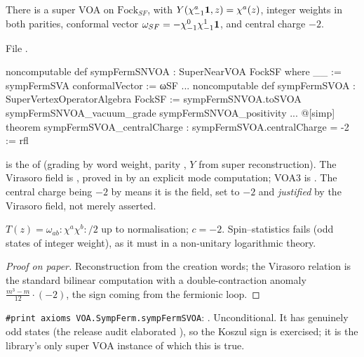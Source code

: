 \begin{theorem}\label{l17:thm:sfsvoa}
There is a super VOA  on $\mathrm{Fock}_{SF}$, with $Y(\chi^a_{-1}\mathbf{1},z)=\chi^a(z)$,
integer weights in both parities, conformal vector $\omega_{SF}=-\chi^0_{-1}\chi^1_{-1}\mathbf{1}$, and
central charge $-2$.
\end{theorem}
\noindent File .
\begin{leancode}
noncomputable def sympFermSNVOA : SuperNearVOA FockSF where
  __ := sympFermSVA
  conformalVector := ωSF
...
noncomputable def sympFermSVOA : SuperVertexOperatorAlgebra FockSF :=
  sympFermSNVOA.toSVOA sympFermSNVOA_vacuum_grade sympFermSNVOA_positivity
...
@[simp] theorem sympFermSVOA_centralCharge : sympFermSVOA.centralCharge = -2 := rfl
\end{leancode}
\begin{dictionary}
 is the  of 
(grading by word weight, parity , $Y$ from super reconstruction). The Virasoro field
is , proved in  by an explicit mode
computation; VOA3 is . The central charge being $-2$ by  means it is the
 field, set to $-2$ and \emph{justified} by the Virasoro field, not merely asserted.
\end{dictionary}
\begin{physics}
$T(z)=\omega_{ab}{:}\chi^a\chi^b{:}/2$ up to normalisation; $c=-2$. Spin--statistics fails (odd
states of integer weight), as it must in a non-unitary logarithmic theory.
\end{physics}
\begin{proof}[Proof on paper]
Reconstruction from the creation words; the Virasoro relation is the standard bilinear computation
with a double-contraction anomaly $\frac{m^3-m}{12}\cdot(-2)$, the sign coming from the fermionic
loop.
\end{proof}
\begin{status}
\texttt{\#print axioms VOA.SympFerm.sympFermSVOA}: .
Unconditional. It has genuinely odd states (the release audit elaborated ), so the Koszul
sign is exercised; it is the library's only super VOA instance of which this is true.
\end{status}

